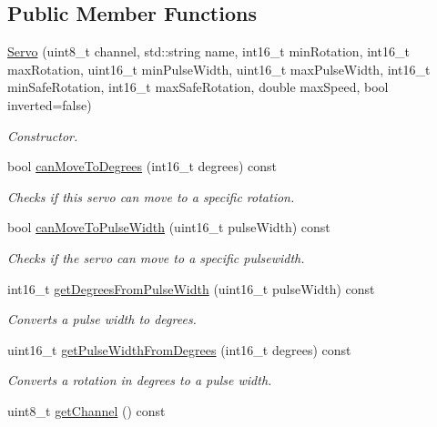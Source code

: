 \subsection*{Public Member Functions}
\begin{DoxyCompactItemize}
\item 
\hyperlink{class_servo_a584bf7fe3e64be597d73b999ef188943}{Servo} (uint8\+\_\+t channel, std\+::string name, int16\+\_\+t min\+Rotation, int16\+\_\+t max\+Rotation, uint16\+\_\+t min\+Pulse\+Width, uint16\+\_\+t max\+Pulse\+Width, int16\+\_\+t min\+Safe\+Rotation, int16\+\_\+t max\+Safe\+Rotation, double max\+Speed, bool inverted=false)
\begin{DoxyCompactList}\small\item\em Constructor. \end{DoxyCompactList}\item 
bool \hyperlink{class_servo_a46bad3775a3ee6942a3b0be5dea6756c}{can\+Move\+To\+Degrees} (int16\+\_\+t degrees) const 
\begin{DoxyCompactList}\small\item\em Checks if this servo can move to a specific rotation. \end{DoxyCompactList}\item 
bool \hyperlink{class_servo_afeecdc6812c2714b1e20e47bea6eacc5}{can\+Move\+To\+Pulse\+Width} (uint16\+\_\+t pulse\+Width) const 
\begin{DoxyCompactList}\small\item\em Checks if the servo can move to a specific pulsewidth. \end{DoxyCompactList}\item 
int16\+\_\+t \hyperlink{class_servo_a141a8ac9632728e2d09403f12b68d1b6}{get\+Degrees\+From\+Pulse\+Width} (uint16\+\_\+t pulse\+Width) const 
\begin{DoxyCompactList}\small\item\em Converts a pulse width to degrees. \end{DoxyCompactList}\item 
uint16\+\_\+t \hyperlink{class_servo_a0966d45b0fb13881a1f5b62ec2e59f10}{get\+Pulse\+Width\+From\+Degrees} (int16\+\_\+t degrees) const 
\begin{DoxyCompactList}\small\item\em Converts a rotation in degrees to a pulse width. \end{DoxyCompactList}\item 
uint8\+\_\+t \hyperlink{class_servo_addd646c6e9c088000cd7421679823661}{get\+Channel} () const 

\end{DoxyCompactItemize}
